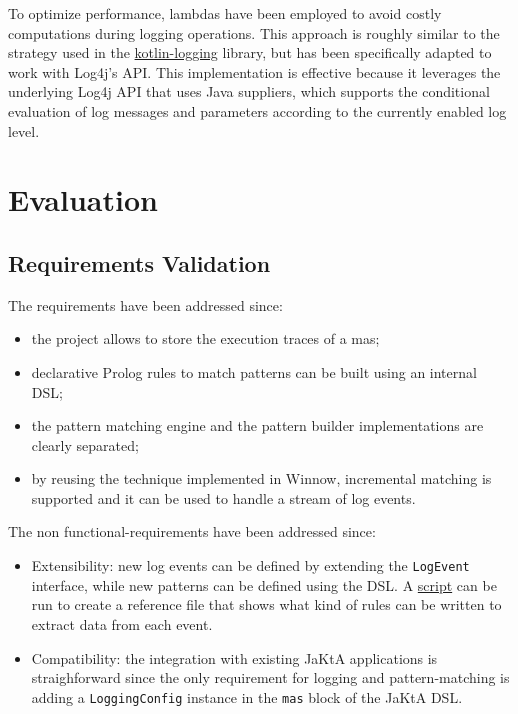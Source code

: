 \documentclass{scrartcl}
\begin{document}
To optimize performance, lambdas have been employed to avoid costly computations during logging operations. This approach is roughly similar to the strategy used in the \href{https://github.com/oshai/kotlin-logging}{kotlin-logging} library, but has been specifically adapted to work with Log4j's API. This implementation is effective because it leverages the underlying Log4j API that uses Java suppliers, which supports the conditional evaluation of log messages and parameters according to the currently enabled log level.

\section{Evaluation}
\subsection{Requirements Validation}

The requirements have been addressed since:

\begin{itemize}
    \item the project allows to store the execution traces of a mas;
    \item declarative Prolog rules to match patterns can be built using an internal DSL;
    \item the pattern matching engine and the pattern builder implementations are clearly separated;
    \item by reusing the technique implemented in Winnow, incremental matching is supported and it can be used to handle a stream of log events.
\end{itemize}

The non functional-requirements have been addressed since:

\begin{itemize} 
    \item Extensibility: new log events can be defined by extending the \verb|LogEvent| interface, while new patterns can be defined using the DSL. A \href{https://github.com/pikalab-unibo-students/master-thesis-battistini-ay2425/blob/feat/jakta-sifting-patterns/jakta-playground/src/main/kotlin/it/unibo/jakta/playground/evaluation/scripts/EventReferenceGenerator.kt}{script} can be run to create a reference file that shows what kind of rules can be written to extract data from each event.
    \item Compatibility: the integration with existing JaKtA applications is straighforward since the only requirement for logging and pattern-matching is adding a \verb|LoggingConfig| instance in the \verb|mas| block of the JaKtA DSL.
\end{itemize}
\end{document}
